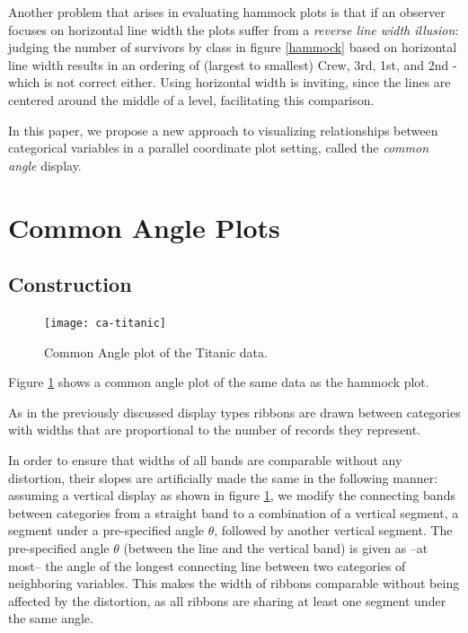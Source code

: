 Another problem that arises in evaluating hammock plots is that if an observer focuses on horizontal line width  the plots suffer from a {\it reverse line width illusion}:  judging the number of survivors by class in figure \ref{hammock} based on horizontal line width  results in an ordering of (largest to smallest) Crew, 3rd, 1st, and 2nd - which is not correct either. Using horizontal width is inviting, since the lines are centered around the middle of a level, facilitating this  comparison. 

In this paper, we propose a new approach to visualizing relationships between categorical variables in a parallel coordinate plot setting, called the {\it common angle} display. 


\section{ Common Angle Plots}
\subsection{Construction}


\begin{figure}[htbp] %
   \centering
   \texttt{[image: ca-titanic]} 
   \caption{Common Angle plot of the Titanic data. }
   \label{fig:ca-titanic}
\end{figure}

Figure \ref{fig:ca-titanic} shows a common angle plot of the same data as the hammock plot.

As in the previously discussed display types ribbons are drawn between categories with widths  that are proportional to  the number of records they represent.

In order to ensure that  widths of all bands are  comparable without any distortion, their slopes  are artificially made the same in the following manner: 
assuming a vertical display as shown in figure \ref{fig:ca-titanic}, we modify  the connecting bands between  categories from a straight band  to a combination of a vertical  segment, a  segment under a pre-specified angle $\theta$, followed by another vertical  segment.  
The pre-specified angle $\theta$ (between the line and the vertical band) is given as --at most-- the angle of the longest connecting line between two categories of neighboring variables. 
This makes the width of ribbons  comparable without being affected by the distortion, as all ribbons are sharing at least one segment under the same angle. 

